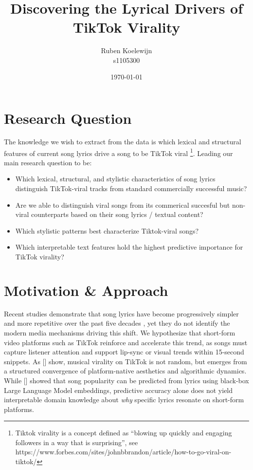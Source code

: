 \documentclass[11pt, a4paper]{article}
\title{Discovering the Lyrical Drivers of TikTok Virality}
\author{Ruben Koelewijn \\ s1105300}
\date{\today}
\newcommand{\cites}[1]{\citeauthor{#1} [\citeyear{#1}]}
\begin{document}
\maketitle

\section*{Research Question}
The knowledge we wish to extract from the data is which lexical and structural features of current song lyrics drive a song to be TikTok viral \footnote{Tiktok virality is a concept defined as ``blowing up quickly and engaging followers in a way that is surprising'', see https://www.forbes.com/sites/johnbbrandon/article/how-to-go-viral-on-tiktok/}. Leading our main research question to be: 
\begin{itemize}
    \item[RQ 1] Which lexical, structural, and stylistic characteristics of song lyrics distinguish TikTok-viral tracks from standard commercially successful music?
    \item[RQ 1.1] Are we able to distinguish viral songs from its commerical succesful but non-viral counterparts based on their song lyrics / textual content? 
    \item[RQ 1.2] Which stylistic patterns best characterize Tiktok-viral songs? 
    \item[RQ 1.3] Which interpretable text features hold the highest predictive importance
for TikTok virality?
\end{itemize}


\section*{Motivation \& Approach}
Recent studies demonstrate that song lyrics have become progressively simpler and more repetitive over the past five decades \cite{Cabaleiro2024}, yet they do not identify the modern media mechanisms driving this shift. We hypothesize that short-form video platforms such as TikTok reinforce and accelerate this trend, as songs must capture listener attention and support lip-sync or visual trends within 15-second snippets. As \cites{fernandez2026} show, musical virality on TikTok is not random, but emerges from a structured convergence of platform-native aesthetics and algorithmic dynamics. While \cites{Prevedello2024} showed that song popularity can be predicted from lyrics using black-box Large Language Model embeddings, predictive accuracy alone does not yield interpretable domain knowledge about \textit{why} specific lyrics resonate on short-form platforms.
\end{document}

